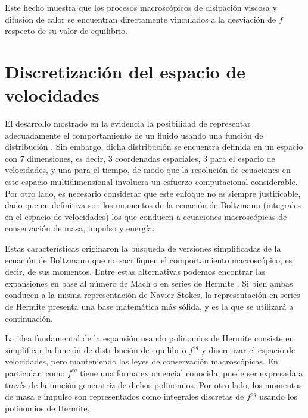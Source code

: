 Este hecho muestra que los procesos macrosc\'opicos de disipaci\'on viscosa y difusi\'on de calor se encuentran directamente vinculados a la desviaci\'on de $f$ respecto de su valor de equilibrio.



\section{Discretizaci\'on del espacio de velocidades} 
El desarrollo mostrado en la  evidencia la posibilidad de representar adecuadamente el comportamiento de un fluido usando una funci\'on de distribuci\'on \fvar{}. Sin embargo, dicha distribuci\'on se encuentra definida en un espacio con 7 dimensiones, es decir, 3 coordenadas espaciales, 3 para el espacio de velocidades, y una para el tiempo, de modo que la resoluci\'on de ecuaciones en este espacio multidimensional involucra un esfuerzo computacional considerable. Por otro lado, es necesario considerar que este enfoque no es siempre justificable, dado que en definitiva son los momentos de la ecuaci\'on de Boltzmann (integrales en el espacio de velocidades) los que conducen a ecuaciones macrosc\'opicas de conservaci\'on de masa, impulso y energ\'ia. 
\par 
Estas caracter\'isticas originaron la b\'usqueda de versiones simplificadas de la ecuaci\'on de Boltzmann que no sacrifiquen el comportamiento macrosc\'opico, es decir, de sus momentos. Entre estas alternativas podemos encontrar las expansiones en base al n\'umero de Mach \cite{he_lattice_1997} o en series de Hermite \cite{shan_kinetic_2006}. Si bien ambas conducen a la misma representaci\'on de Navier-Stokes, la representaci\'on en series de Hermite presenta una base matem\'atica m\'as s\'olida, y es la que se utilizar\'a a continuaci\'on.
\par
La idea fundamental de la espansi\'on usando polinomios de Hermite consiste en simplificar la funci\'on de distribuci\'on de equilibrio $f^{eq}$ y discretizar el espacio de velocidades, pero manteniendo las leyes de conservaci\'on macrosc\'opicas. En particular, como $f^{eq}$ tiene una forma exponencial conocida, puede ser expresada a trav\'es de la funci\'on generatriz de dichos polinomios. Por otro lado, los momentos de masa e impulso son representados como integrales discretas de $f^{eq}$ usando los polinomios de Hermite.


